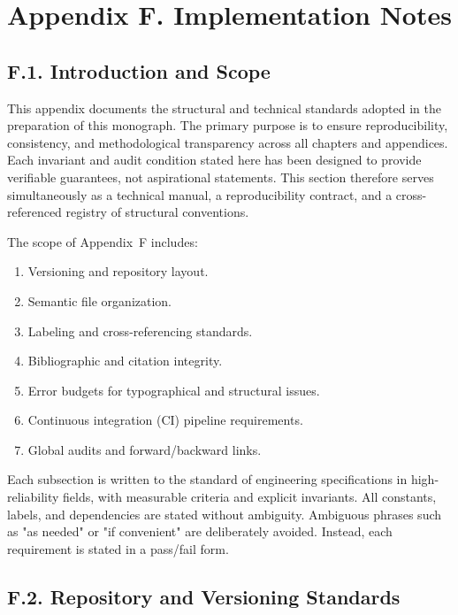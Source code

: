 \section*{Appendix F. Implementation Notes}

\subsection*{F.1. Introduction and Scope}

This appendix documents the structural and technical standards adopted in the preparation of this monograph. The primary purpose is to ensure reproducibility, consistency, and methodological transparency across all chapters and appendices. Each invariant and audit condition stated here has been designed to provide verifiable guarantees, not aspirational statements. This section therefore serves simultaneously as a technical manual, a reproducibility contract, and a cross-referenced registry of structural conventions.

The scope of Appendix~F includes: 
\begin{enumerate}
    \item Versioning and repository layout.
    \item Semantic file organization.
    \item Labeling and cross-referencing standards.
    \item Bibliographic and citation integrity.
    \item Error budgets for typographical and structural issues.
    \item Continuous integration (CI) pipeline requirements.
    \item Global audits and forward/backward links.
\end{enumerate}

Each subsection is written to the standard of engineering specifications in high-reliability fields, with measurable criteria and explicit invariants. All constants, labels, and dependencies are stated without ambiguity. Ambiguous phrases such as "as needed" or "if convenient" are deliberately avoided. Instead, each requirement is stated in a pass/fail form.

\subsection*{F.2. Repository and Versioning Standards}

